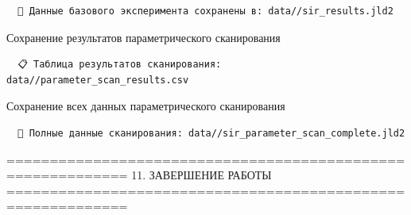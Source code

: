 \documentclass[
  12pt,
  a4paper,
  DIV=11,
  numbers=noendperiod]{scrreprt}
\newenvironment{Shaded}{\begin{snugshade}}{\end{snugshade}}
\newcommand{\FunctionTok}[1]{\textcolor[rgb]{0.28,0.35,0.67}{#1}}
\newcommand{\NormalTok}[1]{\textcolor[rgb]{0.00,0.23,0.31}{#1}}
\newcommand{\OperatorTok}[1]{\textcolor[rgb]{0.37,0.37,0.37}{#1}}
\newcommand{\SpecialCharTok}[1]{\textcolor[rgb]{0.37,0.37,0.37}{#1}}
\newcommand{\StringTok}[1]{\textcolor[rgb]{0.13,0.47,0.30}{#1}}
\begin{document}
\begin{verbatim}
  📁 Данные базового эксперимента сохранены в: data//sir_results.jld2
\end{verbatim}

Сохранение результатов параметрического сканирования

\begin{Shaded}
\end{Shaded}

\begin{verbatim}
  📋 Таблица результатов сканирования: data//parameter_scan_results.csv
\end{verbatim}

Сохранение всех данных параметрического сканирования

\begin{Shaded}
\end{Shaded}

\begin{verbatim}
  📁 Полные данные сканирования: data//sir_parameter_scan_complete.jld2
\end{verbatim}

============================================================ 11.
ЗАВЕРШЕНИЕ РАБОТЫ
============================================================
\end{document}
